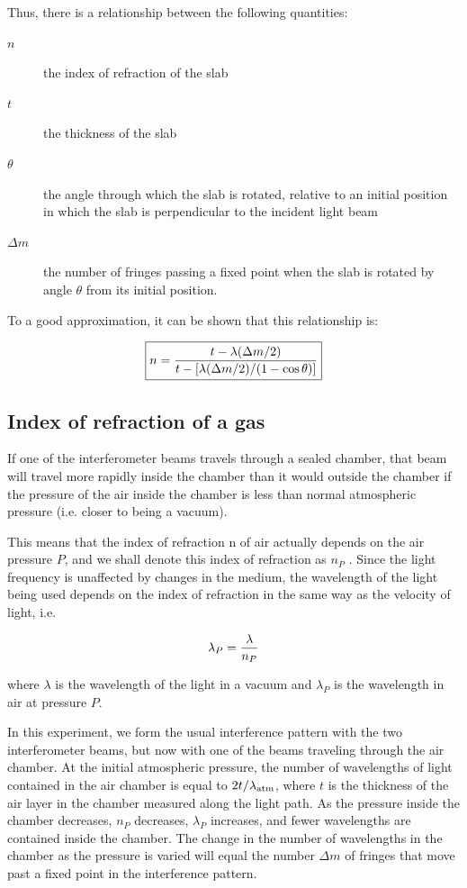 Thus, there is a relationship between the following quantities:
\begin{description}
\item[$n$]  the index of refraction of the slab
\item[$t$]  the thickness of the slab
\item[$\theta$]  the angle through which the slab is rotated, relative to an  initial position in which the slab is perpendicular to the  incident light beam
\item[$\Delta m$]  the number of fringes passing a fixed point when the slab 
is  rotated by angle \ensuremath{\theta} from its initial position.
\end{description}

To a good approximation, it can be shown that this relationship is: 

\begin{equation}
\boxed{ n = { t - \lambda ( \Delta m/2) \over t - \left[ \lambda ( \Delta
      m/2)/(1-\cos\theta) \right] } 
\label{eq:glassslide}}
\end{equation}

\subsection{Index of refraction of a gas}

If one of the interferometer beams travels through a sealed chamber, 
that beam will travel more rapidly inside the chamber than it 
would outside the chamber if the pressure of the air inside the 
chamber is less than normal atmospheric pressure (i.e. closer 
to being a vacuum).

This means that the index of refraction n of air actually depends 
on the air pressure $P$, and we shall denote this index of refraction 
as $n_P$ . Since the light frequency is unaffected by changes in 
the medium, the wavelength of the light being used depends on 
the index of refraction in the same way as the velocity of light, 
i.e.

\begin{equation}
\lambda_P = {\lambda \over n_P}
\label{eq:lambdaP}
\end{equation}

\noindent where $\lambda$ is the wavelength of the light in a vacuum and
$\lambda_P$ is the wavelength in air at pressure $P$.

In this experiment, we form the usual interference pattern with the two
interferometer beams, but now with one of the beams traveling through the air
chamber. At the initial atmospheric pressure, the number of wavelengths of light
contained in the air chamber is equal to $2t/\lambda_{\rm atm}$, where $t$ is
the thickness of the air layer in the chamber measured along the light
path. As the pressure inside
the chamber decreases, $n_P$ decreases, $\lambda_P$ increases, and fewer
wavelengths are contained inside the chamber. The change in the number of
wavelengths in the chamber as the pressure is varied will equal the number
$\Delta m$ of fringes that move past a fixed point in the interference pattern.

